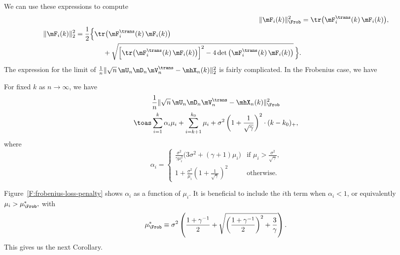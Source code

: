 We can use these expressions to compute
\begin{align}
    \| \mF_i(k) \|_\Frob^2
        &= \tr \big( \mF_i^\trans(k) \, \mF_i(k) \big), \\
    \label{E:F-spec2-formula}
    \begin{split}
    \| \mF_i(k) \|_2^2
        &= \frac{1}{2}
           \Big\{
                 \tr \big( \mF_i^\trans(k) \, \mF_i(k) \big) \\
                 &\qquad\qquad+
                 \sqrt{
                    \left[ 
                        \tr \big( \mF_i^\trans(k) \, \mF_i(k) \big) 
                    \right]^2
                    -
                    4
                    \det \big( \mF_i^\trans(k) \, \mF_i(k) \big) 
                 } \,
           \Big\}.
    \end{split}
\end{align}
The expression for the limit of 
\(
    \frac{1}{n} 
    \| \sqrt{n} \, \mU_n \mD_n \mV_n^\trans - \mhX_n(k) \|_2^2
\)
is fairly complicated.  In the Frobenius case, we have
\begin{proposition}\label{P:frob-loss-behavior}
    For fixed $k$ as $n \to \infty$, we have
    \begin{multline}
        \frac{1}{n}
        \| \sqrt{n} \, \mU_n \mD_n \mV_n^\trans - \mhX_n(k) \|_\Frob^2 \\
        \toas
        \sum_{i=1}^{k}
            \alpha_i \mu_i
        +
        \sum_{i=k+1}^{k_0}
            \mu_i
        +
        \sigma^2
        \left(
            1 + \frac{1}{\sqrt{\gamma}}
        \right)^2
        \cdot
        (k - k_0)_+,
    \end{multline}
    where
    \begin{equation}
        \alpha_i 
        =
        \begin{cases}
            \frac{\sigma^2}{\gamma \mu_i^2}
                    \big(
                        3 \sigma^2 + (\gamma+1) \mu_i
                    \big)
                &\text{if $\mu_i > \frac{\sigma^2}{\sqrt{\gamma}}$,} \\
            1 
            + 
            \frac{\sigma^2}{\mu_i}
            \left(
                1
                +
                \frac{1}{\sqrt{\gamma}}
            \right)^2
                &\text{otherwise.}
        \end{cases}
    \end{equation}
\end{proposition}

Figure~\ref{F:frobenius-loss-penalty} shows $\alpha_i$ as a function of
$\mu_i$.  It is beneficial to include the $i$th term when $\alpha_i < 1$,
or equivalently
\(
    \mu_i
    >
    \mu_\Frob^\ast,
\)
with
\begin{equation}\label{E:frob-cutoff}
    \mu_\Frob^\ast
    \equiv
    \sigma^2
    \left(
    \frac{1 + \gamma^{-1}}{2}
    +
    \sqrt{ 
        \left( \frac{1 + \gamma^{-1} }{2} \right)^2
        +
        \frac{3}{\gamma}
    }
    \right).
\end{equation}
This gives us the next Corollary.


